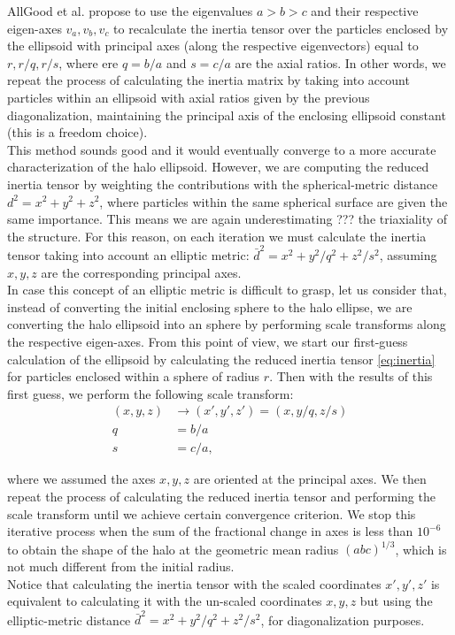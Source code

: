 AllGood et al. propose to use the eigenvalues $a>b>c$ and their respective eigen-axes $v_a,v_b,v_c$ to recalculate the inertia tensor over the particles enclosed by the ellipsoid with principal axes (along the respective eigenvectors) equal to $r,r/q,r/s$, where ere $q = b/a$ and $s=c/a$ are the axial ratios. In other words, we repeat the process of calculating the inertia matrix by taking into account particles within an ellipsoid with axial ratios given by the previous diagonalization, maintaining the principal axis of the enclosing ellipsoid constant (this is a freedom choice).\\

This method sounds good and it would eventually converge to a more accurate characterization of the halo ellipsoid. However, we are computing the reduced inertia tensor by weighting the contributions with the spherical-metric distance $d^2=x^2+y^2+z^2$, where particles within the same spherical surface are given the same importance. This means we are again underestimating ??? the triaxiality of the structure. For this reason, on each iteration we must calculate the inertia tensor taking into account an elliptic metric: $\bar{d}^2 = x^2+y^2/q^2+z^2/s^2$, assuming $x,y,z$ are the corresponding principal axes.\\

In case this concept of an elliptic metric is difficult to grasp, let us consider that, instead of converting the initial enclosing sphere to the halo ellipse, we are converting the halo ellipsoid into an sphere by performing scale transforms along the respective eigen-axes. From this point of view, we start our first-guess calculation of the ellipsoid by calculating the reduced inertia tensor \eqref{eq:inertia} for particles enclosed within a sphere of radius $r$. Then with the results of this first guess, we perform the following scale transform:\\
  
\begin{align}
(x,y,z) &\rightarrow (x',y',z')=(x,y/q,z/s) \label{eq:scale}\\
q &=  b/a \nonumber \\
s &= c/a \nonumber ,
\end{align}

where we assumed the axes $x,y,z$ are oriented at the principal axes. We then repeat the process of calculating the reduced inertia tensor and performing the scale transform until we achieve certain convergence criterion. We stop this iterative process when the sum of the fractional change in axes is less than $10^{-6}$ to obtain the shape of the halo at the geometric mean radius $(abc)^{1/3}$, which is not much different from the initial radius.\\

Notice that calculating the inertia tensor with the scaled coordinates $x',y',z'$ is equivalent to calculating it with the un-scaled coordinates $x,y,z$ but using the elliptic-metric distance $\bar{d}^2 = x^2+y^2/q^2+z^2/s^2$, for diagonalization purposes.\\

